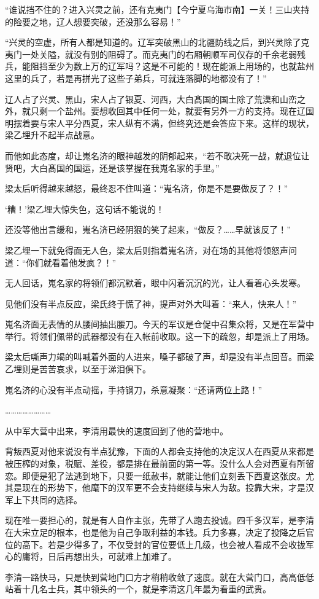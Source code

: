 “谁说挡不住的？进入兴灵之前，还有克夷门【今宁夏乌海市南】一关！三山夹持的险要之地，辽人想要突破，还没那么容易！”

“兴灵的空虚，所有人都是知道的。辽军突破黑山的北疆防线之后，到兴灵除了克夷门一处关隘，就没有别的阻碍了。而克夷门的右厢朝顺军司仅存的千余老弱残兵，能阻挡至少为数上万的辽军吗？这是不可能的！现在能派上用场的，也就盐州这里的兵了，若是再拼光了这些子弟兵，可就连落脚的地都没有了！”

辽人占了兴灵、黑山，宋人占了银夏、河西，大白髙国的国土除了荒漠和山峦之外，就只剩一个盐州。要想收回其中任何一处，就要有另外一方的支持。现在辽国明摆着要与宋人平分西夏，宋人纵有不满，但终究还是会答应下来。这样的现状，梁乙埋升不起半点战意。

而他如此态度，却让嵬名济的眼神越发的阴郁起来，“若不敢决死一战，就退位让贤吧，大白髙国的国运，还是该掌握在我嵬名家的手里。”

梁太后听得越来越怒，最终忍不住叫道：“嵬名济，你是不是要做反了？！”

‘糟！’梁乙埋大惊失色，这句话不能说的！

还没等他出言缓和，嵬名济已经阴狠的笑了起来，“做反？……早就该反了！”

梁乙埋一下就免得面无人色，梁太后则指着嵬名济，对在场的其他将领怒声问道：“你们就看着他发疯？！”

无人回话，嵬名家的将领们都沉默着，眼中闪着沉沉的光，让人看着心头发寒。

见他们没有半点反应，梁氏终于慌了神，提声对外大叫着：“来人，快来人！”

嵬名济面无表情的从腰间抽出腰刀。今天的军议是仓促中召集众将，又是在军营中举行。将领们佩带的武器都没有在入帐前收取。这一下的疏忽，却是派上了用场。

梁太后嘶声力竭的叫喊着外面的人进来，嗓子都破了声，却是没有半点回音。而梁乙埋则是苦苦哀求，以至于涕泪俱下。

嵬名济的心没有半点动摇，手持钢刀，杀意凝聚：“还请两位上路！”

……………………

从中军大营中出来，李清用最快的速度回到了他的营地中。

背叛西夏对他来说没有半点犹豫，下面的人都会支持他的决定汉人在西夏从来都是被压榨的对象，税赋、差役，都是排在最前面的第一等。没什么人会对西夏有所留恋。即便是犯了法逃到地下，只要一纸赦书，就能让他们立刻丢下西夏这张皮。尤其是现在的形势下，他麾下的汉军更不会支持继续与宋人为敌。投靠大宋，才是汉军上下共同的选择。

现在唯一要担心的，就是有人自作主张，先带了人跑去投诚。四千多汉军，是李清在大宋立足的根本，也是他为自己争取利益的本钱。兵力多寡，决定了投降之后官位的高下。若是少得多了，不仅受封的官位要低上几级，也会被人看成不会收拢军心的庸将，日后再想出头，可就难上加难了。

李清一路快马，只是快到营地门口方才稍稍收敛了速度。就在大营门口，高高低低站着十几名士兵，其中领头的一个，就是李清这几年最为看重的武贵。

